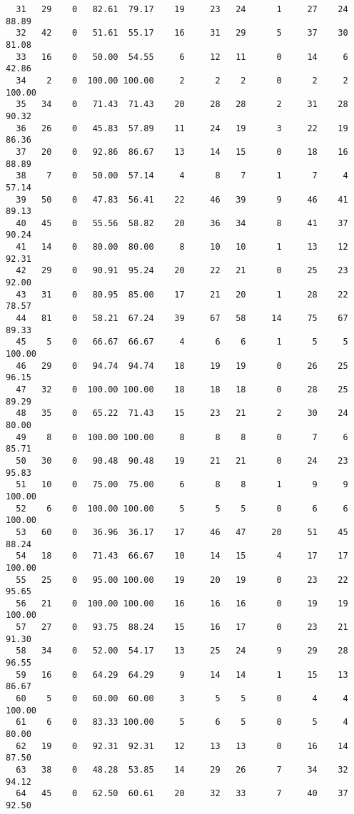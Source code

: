 \begin{verbatim}
  31   29    0   82.61  79.17    19     23   24      1     27    24    88.89
  32   42    0   51.61  55.17    16     31   29      5     37    30    81.08
  33   16    0   50.00  54.55     6     12   11      0     14     6    42.86
  34    2    0  100.00 100.00     2      2    2      0      2     2   100.00
  35   34    0   71.43  71.43    20     28   28      2     31    28    90.32
  36   26    0   45.83  57.89    11     24   19      3     22    19    86.36
  37   20    0   92.86  86.67    13     14   15      0     18    16    88.89
  38    7    0   50.00  57.14     4      8    7      1      7     4    57.14
  39   50    0   47.83  56.41    22     46   39      9     46    41    89.13
  40   45    0   55.56  58.82    20     36   34      8     41    37    90.24
  41   14    0   80.00  80.00     8     10   10      1     13    12    92.31
  42   29    0   90.91  95.24    20     22   21      0     25    23    92.00
  43   31    0   80.95  85.00    17     21   20      1     28    22    78.57
  44   81    0   58.21  67.24    39     67   58     14     75    67    89.33
  45    5    0   66.67  66.67     4      6    6      1      5     5   100.00
  46   29    0   94.74  94.74    18     19   19      0     26    25    96.15
  47   32    0  100.00 100.00    18     18   18      0     28    25    89.29
  48   35    0   65.22  71.43    15     23   21      2     30    24    80.00
  49    8    0  100.00 100.00     8      8    8      0      7     6    85.71
  50   30    0   90.48  90.48    19     21   21      0     24    23    95.83
  51   10    0   75.00  75.00     6      8    8      1      9     9   100.00
  52    6    0  100.00 100.00     5      5    5      0      6     6   100.00
  53   60    0   36.96  36.17    17     46   47     20     51    45    88.24
  54   18    0   71.43  66.67    10     14   15      4     17    17   100.00
  55   25    0   95.00 100.00    19     20   19      0     23    22    95.65
  56   21    0  100.00 100.00    16     16   16      0     19    19   100.00
  57   27    0   93.75  88.24    15     16   17      0     23    21    91.30
  58   34    0   52.00  54.17    13     25   24      9     29    28    96.55
  59   16    0   64.29  64.29     9     14   14      1     15    13    86.67
  60    5    0   60.00  60.00     3      5    5      0      4     4   100.00
  61    6    0   83.33 100.00     5      6    5      0      5     4    80.00
  62   19    0   92.31  92.31    12     13   13      0     16    14    87.50
  63   38    0   48.28  53.85    14     29   26      7     34    32    94.12
  64   45    0   62.50  60.61    20     32   33      7     40    37    92.50

\end{verbatim}
